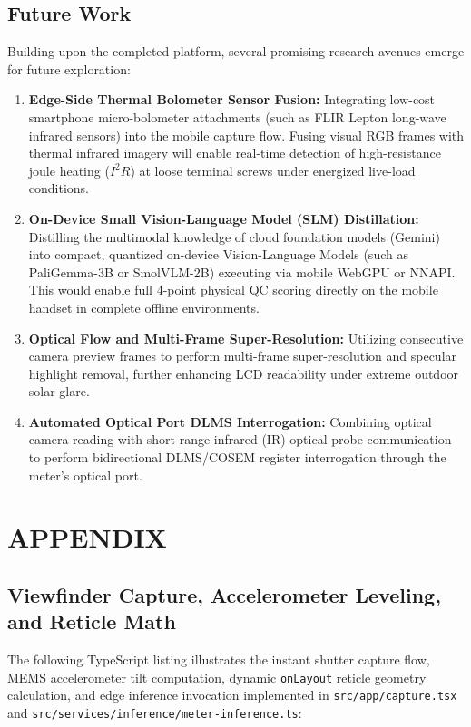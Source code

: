 \documentclass[12pt,a4paper,oneside]{report}
\begin{document}
\section{Future Work}
Building upon the completed platform, several promising research avenues emerge for future exploration:
\begin{enumerate}
    \item \textbf{Edge-Side Thermal Bolometer Sensor Fusion:} Integrating low-cost smartphone micro-bolometer attachments (such as FLIR Lepton long-wave infrared sensors) into the mobile capture flow. Fusing visual RGB frames with thermal infrared imagery will enable real-time detection of high-resistance joule heating ($I^2 R$) at loose terminal screws under energized live-load conditions.
    \item \textbf{On-Device Small Vision-Language Model (SLM) Distillation:} Distilling the multimodal knowledge of cloud foundation models (Gemini) into compact, quantized on-device Vision-Language Models (such as PaliGemma-3B or SmolVLM-2B) executing via mobile WebGPU or NNAPI. This would enable full 4-point physical QC scoring directly on the mobile handset in complete offline environments.
    \item \textbf{Optical Flow and Multi-Frame Super-Resolution:} Utilizing consecutive camera preview frames to perform multi-frame super-resolution and specular highlight removal, further enhancing LCD readability under extreme outdoor solar glare.
    \item \textbf{Automated Optical Port DLMS Interrogation:} Combining optical camera reading with short-range infrared (IR) optical probe communication to perform bidirectional DLMS/COSEM register interrogation through the meter's optical port.
\end{enumerate}

\clearpage

\chapter{APPENDIX}
\label{chap:appendix}

\section{Viewfinder Capture, Accelerometer Leveling, and Reticle Math}
The following TypeScript listing illustrates the instant shutter capture flow, MEMS accelerometer tilt computation, dynamic \texttt{onLayout} reticle geometry calculation, and edge inference invocation implemented in \texttt{src/app/capture.tsx} and \texttt{src/services/inference/meter-inference.ts}:
\end{document}

